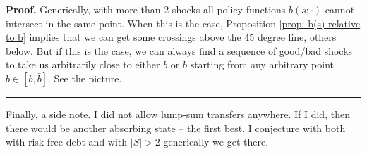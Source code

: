\documentclass{article}
\newenvironment{proof}[1][Proof]{\noindent\textbf{#1.} }{\ \rule{0.5em}{0.5em}}
\begin{document}
\begin{proof}
\smallskip Generically, with more than 2 shocks all policy functions $%
b\left( s;\cdot \right) $ cannot intersect in the same point. When this is
the case, Proposition \ref{prop: b(s) relative to b} implies that we can get
some crossings above the 45 degree line, others below. But if this is the
case, we can always find a sequence of good/bad shocks to take us
arbitrarily close to either $\underline{b}$ or $\bar{b}$ starting from any
arbitrary point $b\in \left[ \underline{b},\bar{b}\right] .$ See the picture.
\end{proof}


Finally, a side note. I did not allow lump-sum transfers anywhere. If I did,
then there would be another absorbing state -- the first best. I conjecture
with both with risk-free debt and with $|S|>2$ generically we get there.
\end{document}
